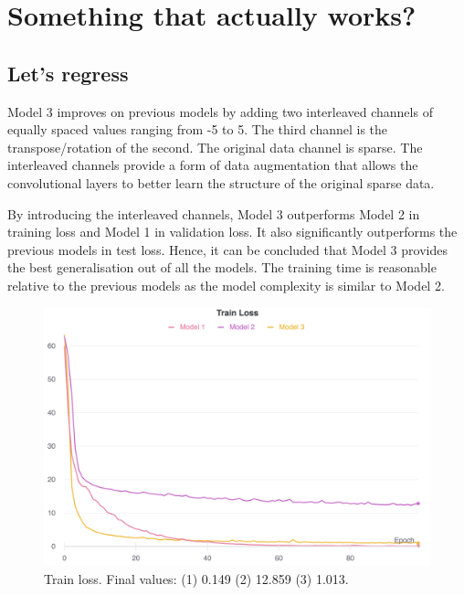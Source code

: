 \documentclass[twocolumn]{article}
\begin{document}
\section{Something that actually works?} \label{sec:3}

\subsection{Let's regress}

Model 3 improves on previous models by adding two interleaved channels of equally spaced values ranging from -5 to 5. The third channel is the transpose/rotation of the second. The original data channel is sparse. The interleaved channels provide a form of data augmentation that allows the convolutional layers to better learn the structure of the original sparse data.

By introducing the interleaved channels, Model 3 outperforms Model 2 in training loss and Model 1 in validation loss. It also significantly outperforms the previous models in test loss. Hence, it can be concluded that Model 3 provides the best generalisation out of all the models. The training time is reasonable relative to the previous models as the model complexity is similar to Model 2.

\begin{figure}
    \centering
    \includegraphics[width=\linewidth]{Figures/train-loss.png}
    \caption{Train loss. Final values: (1) 0.149 (2) 12.859 (3) 1.013.}
    \label{fig:train-loss}
\end{figure}
\end{document}
